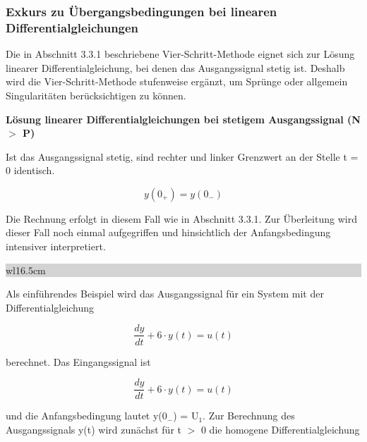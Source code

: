 \subsubsection{Exkurs zu Übergangsbedingungen bei linearen Differentialgleichungen}\label{threethreetwo}

\noindent Die in Abschnitt 3.3.1 beschriebene Vier-Schritt-Methode eignet sich zur Lösung linearer Differentialgleichung, bei denen das Ausgangssignal stetig ist. Deshalb wird die Vier-Schritt-Methode stufenweise ergänzt, um Sprünge oder allgemein Singularitäten berücksichtigen zu können.\bigskip

{\selectfont
\noindent\textbf{Lösung linearer Differentialgleichungen bei stetigem Ausgangssignal (N $\boldsymbol{\mathrm{>}}$ P)}}

\noindent Ist das Ausgangssignal stetig, sind rechter und linker Grenzwert an der Stelle t = 0 identisch.

\begin{equation}\label{eq:eightyseven}
y\left(0_{+} \right)=y\left(0_{-} \right)
\end{equation}

\noindent Die Rechnung erfolgt in diesem Fall wie in Abschnitt 3.3.1. Zur Überleitung wird dieser Fall noch einmal aufgegriffen und hinsichtlich der Anfangsbedingung intensiver interpretiert.\bigskip

\noindent
\colorbox{lightgray}{%
%
\renewcommand\arraystretch{0.6}%
\begin{tabular}{ wl{16.5cm} }
{\selectfont{
Beispiel: Lineare Differentialgleichung und stetiges Ausgangssignal}}
\end{tabular}%
}\bigskip

\noindent Als einführendes Beispiel wird das Ausgangssignal für ein System mit der Differentialgleichung

\begin{equation}\label{eq:eightyeight}
\frac{dy}{dt} +6\cdot y\left(t\right)=u\left(t\right)
\end{equation}

\noindent berechnet. Das Eingangssignal ist 

\begin{equation}\label{eq:eightynine}
\frac{dy}{dt} +6\cdot y\left(t\right)=u\left(t\right)
\end{equation}

\noindent und die Anfangsbedingung lautet y(0${}_{-}$) = U${}_{1}$. Zur Berechnung des Ausgangssignals y(t) wird zunächst für t $\mathrm{>}$ 0 die homogene Differentialgleichung 

